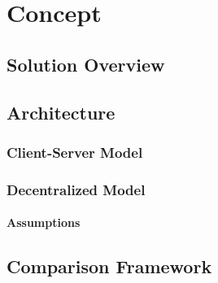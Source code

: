 
\chapter{Concept}
\label{chp:concept}

\section{Solution Overview}

\section{Architecture}
	\subsection{Client-Server Model}
	\subsection{Decentralized Model}
		\subsubsection{Assumptions}
		
\section{Comparison Framework}